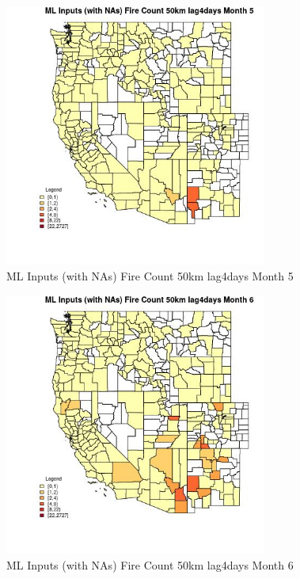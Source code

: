\begin{figure} 
\centering  
\includegraphics[width=0.77\textwidth]{Code_Outputs/Report_ML_input_PM25_Step4_part_f_de_duplicated_aveswNAs_CountyFire_Count_50km_lag4daysmedianMonth5.jpg} 
\caption{\label{fig:Report_ML_input_PM25_Step4_part_f_de_duplicated_aveswNAsCountyFire_Count_50km_lag4daysmedianMonth5}ML Inputs (with NAs) Fire Count 50km lag4days Month 5} 
\end{figure} 
 

\begin{figure} 
\centering  
\includegraphics[width=0.77\textwidth]{Code_Outputs/Report_ML_input_PM25_Step4_part_f_de_duplicated_aveswNAs_CountyFire_Count_50km_lag4daysmedianMonth6.jpg} 
\caption{\label{fig:Report_ML_input_PM25_Step4_part_f_de_duplicated_aveswNAsCountyFire_Count_50km_lag4daysmedianMonth6}ML Inputs (with NAs) Fire Count 50km lag4days Month 6} 
\end{figure} 
 

